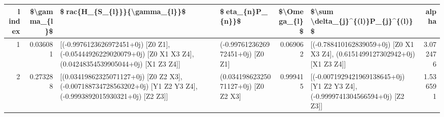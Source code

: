 \begin{tabular}{rrllrlr}
\toprule
 l index &  \$\textbackslash gamma\_\{l\}\$ &                                                                                                                                                                                                                                                                                                                                   \$rac\{H\_\{S\_\{l\}\}\}\{\textbackslash gamma\_\{l\}\}\$ &                             \$eta\_\{n\}P\_\{n\}\}\$ &  \$\textbackslash Omega\_\{l\}\$ &                                                                                                                                                                                                                                                                                         \$\textbackslash sum \textbackslash delta\_\{j\}\textasciicircum \{(l)\}P\_\{j\}\textasciicircum \{(l)\}\$ &     alpha \\
\midrule
       1 &      0.036081 &                                                                                                                                                                                                                                                [(-0.9976123626972451+0j) [Z0 Z1], (-0.05444926229020079+0j) [Z0 X1 X3 Z4], (0.04248354539905044+0j) [X1 Z3 Z4]] &             (-0.9976123626972451+0j) [Z0 Z1] &      0.069062 &                                                                                                                                                                                                                                                [(-0.788410162839059+0j) [Z0 X1 X3 Z4], (0.6151499127302942+0j) [X1 Z3 Z4]] &  3.072476 \\
       2 &      0.273288 &                                                                                                                                                                                                                                               [(0.03419862325071127+0j) [Z0 Z2 X3], (-0.007188734728563202+0j) [Y1 Z2 Y3 Z4], (-0.9993892015930321+0j) [Z2 Z3]] &          (0.03419862325071127+0j) [Z0 Z2 X3] &      0.999415 &                                                                                                                                                                                                                                              [(-0.0071929421969138645+0j) [Y1 Z2 Y3 Z4], (-0.9999741304566594+0j) [Z2 Z3]] &  1.536591 \\

\end{tabular}
